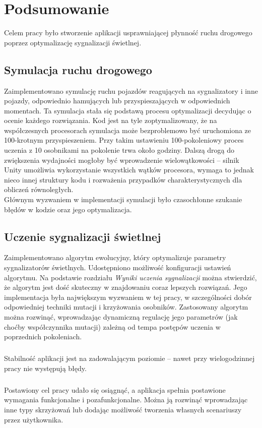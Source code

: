 \chapter*{Podsumowanie}
Celem pracy było stworzenie aplikacji usprawniającej płynność ruchu drogowego poprzez optymalizację sygnalizacji świetlnej.
\section*{Symulacja ruchu drogowego}
Zaimplementowano symulację ruchu pojazdów reagujących na sygnalizatory i inne pojazdy, odpowiednio hamujących lub przyspieszających w odpowiednich momentach. Ta symulacja stała się podstawą procesu optymalizacji decydując o ocenie każdego rozwiązania. Kod jest na tyle zoptymalizowany, że na współczesnych procesorach symulacja może bezproblemowo być uruchomiona ze 100-krotnym przyspieszeniem. Przy takim ustawieniu 100-pokoleniowy proces uczenia z 10 osobnikami na pokolenie trwa około godziny. Dalszą drogą do zwiększenia wydajności mogłoby być wprowadzenie wielowątkowości -- silnik Unity umożliwia wykorzystanie wszystkich wątków procesora, wymaga to jednak nieco innej struktury kodu i rozważenia przypadków charakterystycznych dla obliczeń równoległych.\\
Głównym wyzwaniem w implementacji symulacji było czasochłonne szukanie błędów w kodzie oraz jego optymalizacja.
\section*{Uczenie sygnalizacji świetlnej}
Zaimplementowano algorytm ewolucyjny, który optymalizuje parametry sygnalizatorów świetlnych. Udostępniono możliwość konfiguracji ustawień algorytmu. Na podstawie rozdziału \textit{Wyniki uczenia sygnalizacji} można stwierdzić, że algorytm jest dość skuteczny w znajdowaniu coraz lepszych rozwiązań. Jego implementacja była największym wyzwaniem w tej pracy, w szczególności dobór odpowiedniej techniki mutacji i krzyżowania osobników. Zastosowany algorytm można rozwinąć, wprowadzając dynamiczną regulację jego parametrów (jak choćby współczynnika mutacji) zależną od tempa postępów uczenia w poprzednich pokoleniach.
\paragraph{} 
Stabilność aplikacji jest na zadowalającym poziomie -- nawet przy wielogodzinnej pracy nie występują błędy.
\paragraph{} 
Postawiony cel pracy udało się osiągnąć, a aplikacja spełnia postawione wymagania funkcjonalne i pozafunkcjonalne. Można ją rozwinąć wprowadzając inne typy skrzyżowań lub dodając możliwość tworzenia własnych scenariuszy przez użytkownika.